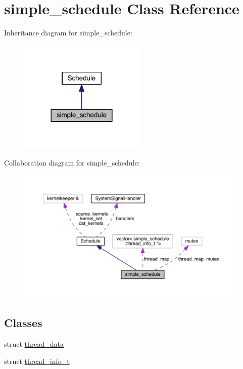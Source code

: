 \hypertarget{classsimple__schedule}{}\section{simple\+\_\+schedule Class Reference}
\label{classsimple__schedule}


Inheritance diagram for simple\+\_\+schedule\+:
\nopagebreak
\begin{figure}[H]
\begin{center}
\leavevmode
\includegraphics[width=170pt]{classsimple__schedule__inherit__graph}
\end{center}
\end{figure}


Collaboration diagram for simple\+\_\+schedule\+:
\nopagebreak
\begin{figure}[H]
\begin{center}
\leavevmode
\includegraphics[width=350pt]{classsimple__schedule__coll__graph}
\end{center}
\end{figure}
\subsection*{Classes}
\begin{DoxyCompactItemize}
\item 
struct \hyperlink{structsimple__schedule_1_1thread__data}{thread\+\_\+data}
\item 
struct \hyperlink{structsimple__schedule_1_1thread__info__t}{thread\+\_\+info\+\_\+t}
\end{DoxyCompactItemize}
